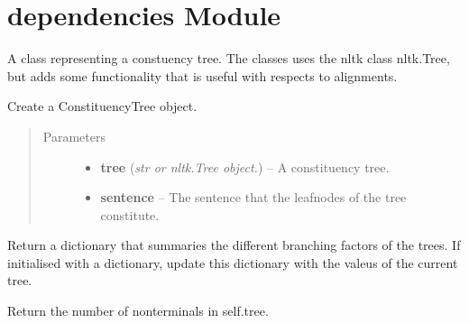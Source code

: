 \documentclass[letterpaper,10pt,english]{sphinxmanual}
\begin{document}
\chapter{dependencies Module}
\label{constituencies:module-constituencies}\label{constituencies:dependencies-module}\label{constituencies::doc}

\begin{fulllineitems}
\label{constituencies:constituencies.ConstituencyTree}
A class representing a constuency tree. The classes uses
the nltk class nltk.Tree, but adds some functionality that
is useful with respects to alignments.

Create a ConstituencyTree object.
\begin{quote}\begin{description}
\item[{Parameters}] \leavevmode\begin{itemize}
\item {} 
\textbf{tree} (\emph{str or nltk.Tree object.}) -- A constituency tree.

\item {} 
\textbf{sentence} -- The sentence that the leafnodes of the tree constitute.

\end{itemize}

\end{description}\end{quote}

\begin{fulllineitems}
\label{constituencies:constituencies.ConstituencyTree.branching_factor}
Return a dictionary that summaries the different 
branching factors of the trees. If initialised with
a dictionary, update this dictionary with the
valeus of the current tree.

\end{fulllineitems}


\begin{fulllineitems}
\label{constituencies:constituencies.ConstituencyTree.nr_of_nonterminals}
Return the number of nonterminals in self.tree.


\end{fulllineitems}
\end{fulllineitems}
\end{document}
